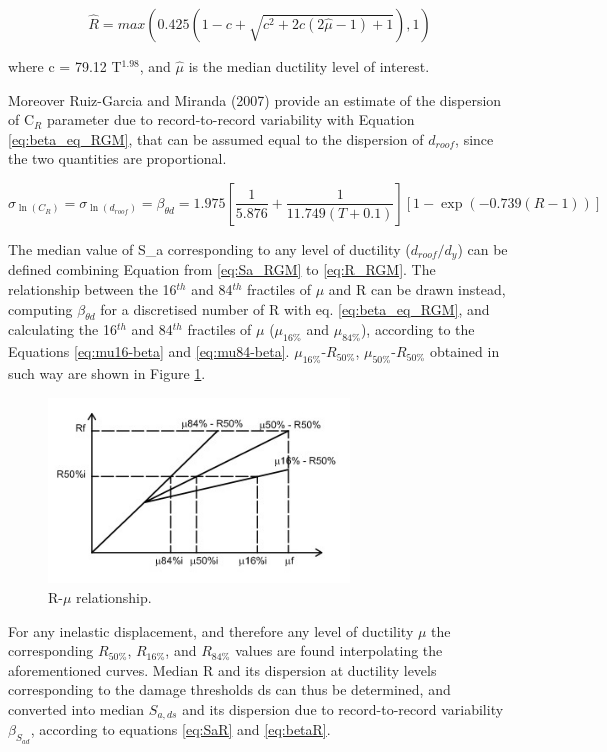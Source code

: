 \begin{equation}
\hat{R} = max(0.425(1 - c + \sqrt{c^2 + 2c(2 \hat{\mu} - 1) + 1}),1)
\label{eq:R_RGM}
\end{equation}

where c = 79.12 T$^{1.98}$, and $\hat{\mu}$ is the median ductility level of interest.

Moreover Ruiz-Garcia and Miranda (2007) provide an estimate of the dispersion of C$_{R}$ parameter due to record-to-record variability with Equation \ref{eq:beta_eq_RGM}, that can be assumed equal to the dispersion of $d_{roof}$, since the two quantities are proportional.

\begin{equation}
\sigma_{\ln(C_R)} = \sigma_{\ln(d_{roof})} = \beta_{\theta d} = 1.975 [\frac{1}{5.876} + \frac{1}{11.749 (T + 0.1)}] [1- \exp(-0.739 (R - 1))]
\label{eq:beta_eq_RGM}
\end{equation}

The median value of S_a corresponding to any level of ductility ($d_{roof}/d_y$) can be defined combining Equation from \ref{eq:Sa_RGM} to \ref{eq:R_RGM}. The relationship between the 16$^{th}$ and 84$^{th}$ fractiles of $\mu$ and R can be drawn instead, computing $\beta_{\theta d}$ for a discretised number of R with eq. \ref{eq:beta_eq_RGM}, and calculating the 16$^{th}$ and 84$^{th}$ fractiles of $\mu$ ($\mu_{16\%}$ and $\mu_{84\%}$), according to the Equations \ref{eq:mu16-beta} and \ref{eq:mu84-beta}. $\mu_{16\%}$-$R_{50\%}$, $\mu_{50\%}$-$R_{50\%}$ obtained in such way are shown in Figure \ref{fig:Rmu}.

\begin{figure}[!htbp]
\centering
\includegraphics[width=8cm]{./figures/Rmu.jpg}
\caption{R-$\mu$ relationship.}
\label{fig:Rmu}
\end{figure}

For any inelastic displacement, and therefore any level of ductility $\mu$ the corresponding $R_{50\%}$, $R_{16\%}$, and $R_{84\%}$ values are found interpolating the aforementioned curves. Median R and its dispersion at ductility levels corresponding to the damage thresholds ds can thus be determined, and converted into median $S_{a, ds}$ and its dispersion due to record-to-record variability $\beta_{S_{a d}}$, according to equations \ref{eq:SaR} and \ref{eq:betaR}. 

